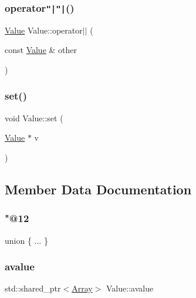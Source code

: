\subsubsection{\texorpdfstring{operator\texttt{"|}\texttt{"|}()}{operator||()}}
{\footnotesize\ttfamily \hyperlink{classValue}{Value} Value\+::operator$\vert$$\vert$ (\begin{DoxyParamCaption}\item[{const \hyperlink{classValue}{Value} \&}]{other }\end{DoxyParamCaption})}

\mbox{\label{classValue_a83944ac4d53d5bd27fd6a0bd2bc1bd3a}} 
\subsubsection{\texorpdfstring{set()}{set()}}
{\footnotesize\ttfamily void Value\+::set (\begin{DoxyParamCaption}\item[{\hyperlink{classValue}{Value} $\ast$}]{v }\end{DoxyParamCaption})}



\subsection{Member Data Documentation}
\mbox{\label{classValue_ad1da8326a7b233b3cc1708236cecfc6b}} 
\subsubsection{\texorpdfstring{"@12}{@12}}
{\footnotesize\ttfamily union \{ ... \} }

\mbox{\label{classValue_acb0c09facf0b3b0a88f6fb5a240c1783}} 
\subsubsection{\texorpdfstring{avalue}{avalue}}
{\footnotesize\ttfamily std\+::shared\+\_\+ptr$<$\hyperlink{classArray}{Array}$>$ Value\+::avalue}

\mbox{\label{classValue_a6690838c4e198bd9b371108cffcd09e3}} 
